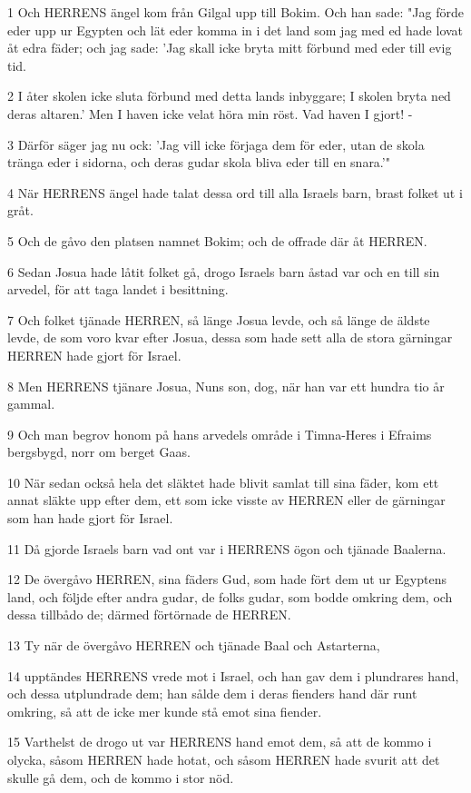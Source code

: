 \par 1 Och HERRENS ängel kom från Gilgal upp till Bokim. Och han sade: "Jag förde eder upp ur Egypten och lät eder komma in i det land som jag med ed hade lovat åt edra fäder; och jag sade: 'Jag skall icke bryta mitt förbund med eder till evig tid.
\par 2 I åter skolen icke sluta förbund med detta lands inbyggare; I skolen bryta ned deras altaren.' Men I haven icke velat höra min röst. Vad haven I gjort! -
\par 3 Därför säger jag nu ock: 'Jag vill icke förjaga dem för eder, utan de skola tränga eder i sidorna, och deras gudar skola bliva eder till en snara.'"
\par 4 När HERRENS ängel hade talat dessa ord till alla Israels barn, brast folket ut i gråt.
\par 5 Och de gåvo den platsen namnet Bokim; och de offrade där åt HERREN.
\par 6 Sedan Josua hade låtit folket gå, drogo Israels barn åstad var och en till sin arvedel, för att taga landet i besittning.
\par 7 Och folket tjänade HERREN, så länge Josua levde, och så länge de äldste levde, de som voro kvar efter Josua, dessa som hade sett alla de stora gärningar HERREN hade gjort för Israel.
\par 8 Men HERRENS tjänare Josua, Nuns son, dog, när han var ett hundra tio år gammal.
\par 9 Och man begrov honom på hans arvedels område i Timna-Heres i Efraims bergsbygd, norr om berget Gaas.
\par 10 När sedan också hela det släktet hade blivit samlat till sina fäder, kom ett annat släkte upp efter dem, ett som icke visste av HERREN eller de gärningar som han hade gjort för Israel.
\par 11 Då gjorde Israels barn vad ont var i HERRENS ögon och tjänade Baalerna.
\par 12 De övergåvo HERREN, sina fäders Gud, som hade fört dem ut ur Egyptens land, och följde efter andra gudar, de folks gudar, som bodde omkring dem, och dessa tillbådo de; därmed förtörnade de HERREN.
\par 13 Ty när de övergåvo HERREN och tjänade Baal och Astarterna,
\par 14 upptändes HERRENS vrede mot i Israel, och han gav dem i plundrares hand, och dessa utplundrade dem; han sålde dem i deras fienders hand där runt omkring, så att de icke mer kunde stå emot sina fiender.
\par 15 Varthelst de drogo ut var HERRENS hand emot dem, så att de kommo i olycka, såsom HERREN hade hotat, och såsom HERREN hade svurit att det skulle gå dem, och de kommo i stor nöd.
